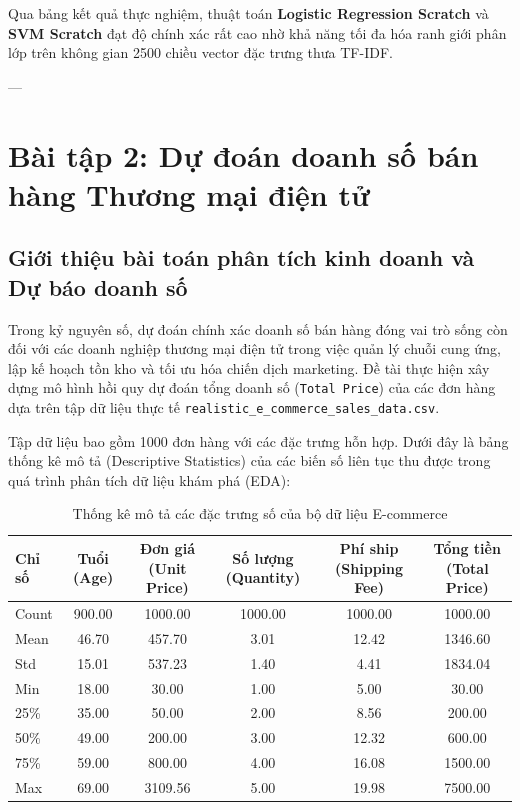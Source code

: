 \documentclass[a4paper]{article}
\begin{document}
Qua bảng kết quả thực nghiệm, thuật toán \textbf{Logistic Regression Scratch} và \textbf{SVM Scratch} đạt độ chính xác rất cao nhờ khả năng tối đa hóa ranh giới phân lớp trên không gian 2500 chiều vector đặc trưng thưa TF-IDF. 

---

\section{Bài tập 2: Dự đoán doanh số bán hàng Thương mại điện tử}

\subsection{Giới thiệu bài toán phân tích kinh doanh và Dự báo doanh số}
Trong kỷ nguyên số, dự đoán chính xác doanh số bán hàng đóng vai trò sống còn đối với các doanh nghiệp thương mại điện tử trong việc quản lý chuỗi cung ứng, lập kế hoạch tồn kho và tối ưu hóa chiến dịch marketing. Đề tài thực hiện xây dựng mô hình hồi quy dự đoán tổng doanh số (\texttt{Total Price}) của các đơn hàng dựa trên tập dữ liệu thực tế \texttt{realistic\_e\_commerce\_sales\_data.csv}.

Tập dữ liệu bao gồm 1000 đơn hàng với các đặc trưng hỗn hợp. Dưới đây là bảng thống kê mô tả (Descriptive Statistics) của các biến số liên tục thu được trong quá trình phân tích dữ liệu khám phá (EDA):

\begin{table}[H]
\centering
\caption{Thống kê mô tả các đặc trưng số của bộ dữ liệu E-commerce}
\label{tab:sales_eda_stats}
\begin{tabular}{lccccc}
\toprule
\textbf{Chỉ số} & \textbf{Tuổi (Age)} & \textbf{Đơn giá (Unit Price)} & \textbf{Số lượng (Quantity)} & \textbf{Phí ship (Shipping Fee)} & \textbf{Tổng tiền (Total Price)} \\ \midrule
Count & 900.00 & 1000.00 & 1000.00 & 1000.00 & 1000.00 \\
Mean & 46.70 & 457.70 & 3.01 & 12.42 & 1346.60 \\
Std & 15.01 & 537.23 & 1.40 & 4.41 & 1834.04 \\
Min & 18.00 & 30.00 & 1.00 & 5.00 & 30.00 \\
25\% & 35.00 & 50.00 & 2.00 & 8.56 & 200.00 \\
50\% & 49.00 & 200.00 & 3.00 & 12.32 & 600.00 \\
75\% & 59.00 & 800.00 & 4.00 & 16.08 & 1500.00 \\
Max & 69.00 & 3109.56 & 5.00 & 19.98 & 7500.00 \\ \bottomrule
\end{tabular}
\end{table}
\end{document}
